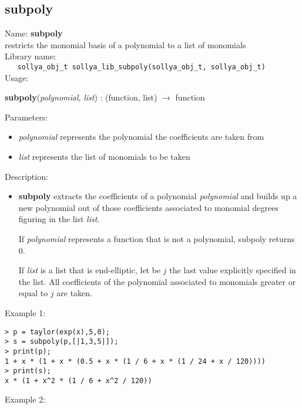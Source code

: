 \subsection{subpoly}
\label{labsubpoly}
\noindent Name: \textbf{subpoly}\\
\phantom{aaa}restricts the monomial basis of a polynomial to a list of monomials\\[0.2cm]
\noindent Library name:\\
\verb|   sollya_obj_t sollya_lib_subpoly(sollya_obj_t, sollya_obj_t)|\\[0.2cm]
\noindent Usage: 
\begin{center}
\textbf{subpoly}(\emph{polynomial}, \emph{list}) : (\textsf{function}, \textsf{list}) $\rightarrow$ \textsf{function}\\
\end{center}
Parameters: 
\begin{itemize}
\item \emph{polynomial} represents the polynomial the coefficients are taken from
\item \emph{list} represents the list of monomials to be taken
\end{itemize}
\noindent Description: \begin{itemize}

\item \textbf{subpoly} extracts the coefficients of a polynomial \emph{polynomial} and builds up a
   new polynomial out of those coefficients associated to monomial degrees figuring in
   the list \emph{list}. 
    
   If \emph{polynomial} represents a function that is not a polynomial, subpoly returns 0.
    
   If \emph{list} is a list that is end-elliptic, let be $j$ the last value explicitly specified
   in the list. All coefficients of the polynomial associated to monomials greater or
   equal to $j$ are taken.
\end{itemize}
\noindent Example 1: 
\begin{center}\begin{minipage}{15cm}\begin{Verbatim}[frame=single]
> p = taylor(exp(x),5,0);
> s = subpoly(p,[|1,3,5|]);
> print(p);
1 + x * (1 + x * (0.5 + x * (1 / 6 + x * (1 / 24 + x / 120))))
> print(s);
x * (1 + x^2 * (1 / 6 + x^2 / 120))
\end{Verbatim}
\end{minipage}\end{center}
\noindent Example 2: 
